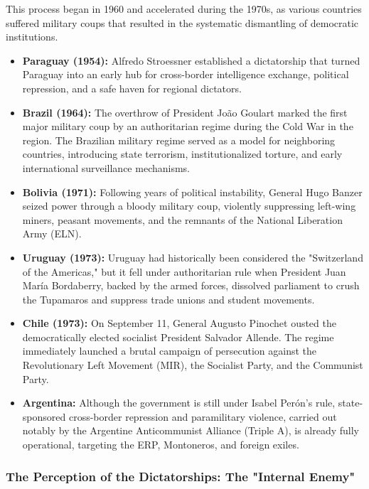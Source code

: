 This process began in 1960 and accelerated during the 1970s, as various countries suffered military coups that resulted in the systematic dismantling of democratic institutions.

\begin{itemize}
  \item \textbf{Paraguay (1954):} Alfredo Stroessner established a dictatorship that turned Paraguay into an early hub for cross-border intelligence exchange, political repression, and a safe haven for regional dictators.
  \item \textbf{Brazil (1964):} The overthrow of President João Goulart marked the first major military coup by an authoritarian regime during the Cold War in the region. The Brazilian military regime served as a model for neighboring countries, introducing state terrorism, institutionalized torture, and early international surveillance mechanisms.
  \item \textbf{Bolivia (1971):} Following years of political instability, General Hugo Banzer seized power through a bloody military coup, violently suppressing left-wing miners, peasant movements, and the remnants of the National Liberation Army (ELN).
  \item \textbf{Uruguay (1973):} Uruguay had historically been considered the "Switzerland of the Americas," but it fell under authoritarian rule when President Juan María Bordaberry, backed by the armed forces, dissolved parliament to crush the Tupamaros and suppress trade unions and student movements.
  \item \textbf{Chile (1973):} On September 11, General Augusto Pinochet ousted the democratically elected socialist President Salvador Allende. The regime immediately launched a brutal campaign of persecution against the Revolutionary Left Movement (MIR), the Socialist Party, and the Communist Party.
  \item \textbf{Argentina:} Although the government is still under Isabel Perón’s rule, state-sponsored cross-border repression and paramilitary violence, carried out notably by the Argentine Anticommunist Alliance (Triple A), is already fully operational, targeting the ERP, Montoneros, and foreign exiles.
\end{itemize}

\subsubsection{The Perception of the Dictatorships: The "Internal Enemy"}

